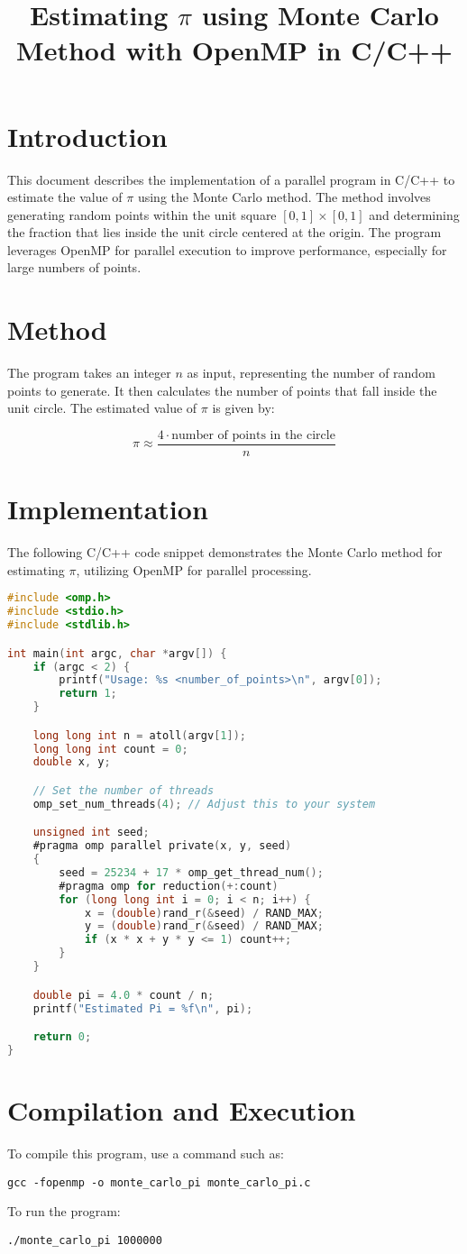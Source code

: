 \documentclass[12pt]{article}
\title{Estimating \(\pi\) using Monte Carlo Method with OpenMP in C/C++}
\author{}
\date{}
\begin{document}
\maketitle

\section{Introduction}
This document describes the implementation of a parallel program in C/C++ to estimate the value of \(\pi\) using the Monte Carlo method. The method involves generating random points within the unit square \([0,1] \times [0,1]\) and determining the fraction that lies inside the unit circle centered at the origin. The program leverages OpenMP for parallel execution to improve performance, especially for large numbers of points.

\section{Method}
The program takes an integer \(n\) as input, representing the number of random points to generate. It then calculates the number of points that fall inside the unit circle. The estimated value of \(\pi\) is given by:

\[
\pi \approx \frac{4 \cdot \text{number of points in the circle}}{n}
\]

\section{Implementation}
The following C/C++ code snippet demonstrates the Monte Carlo method for estimating \(\pi\), utilizing OpenMP for parallel processing.

\begin{lstlisting}[language=C]
#include <omp.h>
#include <stdio.h>
#include <stdlib.h>

int main(int argc, char *argv[]) {
    if (argc < 2) {
        printf("Usage: %s <number_of_points>\n", argv[0]);
        return 1;
    }

    long long int n = atoll(argv[1]);
    long long int count = 0;
    double x, y;

    // Set the number of threads
    omp_set_num_threads(4); // Adjust this to your system

    unsigned int seed;
    #pragma omp parallel private(x, y, seed)
    {
        seed = 25234 + 17 * omp_get_thread_num();
        #pragma omp for reduction(+:count)
        for (long long int i = 0; i < n; i++) {
            x = (double)rand_r(&seed) / RAND_MAX;
            y = (double)rand_r(&seed) / RAND_MAX;
            if (x * x + y * y <= 1) count++;
        }
    }

    double pi = 4.0 * count / n;
    printf("Estimated Pi = %f\n", pi);

    return 0;
}
\end{lstlisting}

\section{Compilation and Execution}
To compile this program, use a command such as:
\begin{verbatim}
gcc -fopenmp -o monte_carlo_pi monte_carlo_pi.c
\end{verbatim}

To run the program:
\begin{verbatim}
./monte_carlo_pi 1000000
\end{verbatim}
\end{document}
